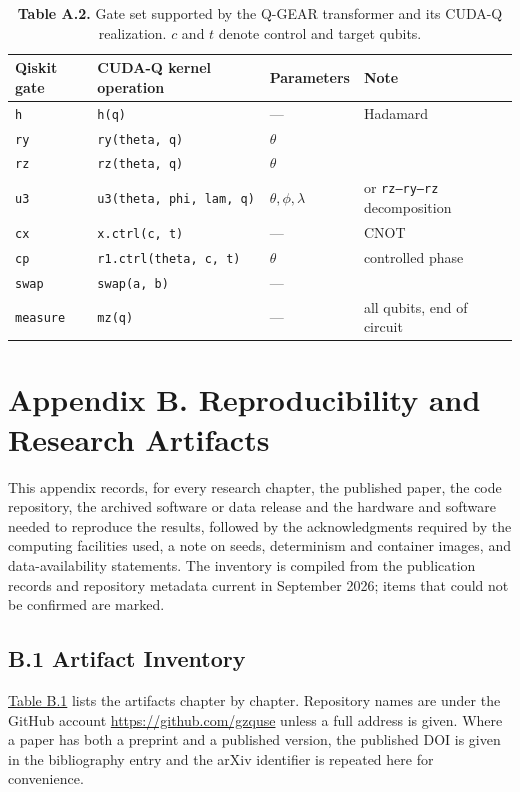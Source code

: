 \documentclass{report}
\theoremstyle{plain}
\theoremstyle{definition}
\theoremstyle{remark}
\begin{document}
\begin{table}[htbp]
\caption{\textbf{Table A.2.} Gate set supported by the Q-GEAR transformer and its CUDA-Q realization. $c$ and $t$ denote control and target qubits.}
\label{tab:appqgear:gates}
 
  \footnotesize
\begin{tabular}{llll}
\toprule
Qiskit gate & CUDA-Q kernel operation & Parameters & Note \\
\midrule
\texttt{h} & \texttt{h(q)} & --- & Hadamard \\
\texttt{ry} & \texttt{ry(theta, q)} & $\theta$ & \\
\texttt{rz} & \texttt{rz(theta, q)} & $\theta$ & \\
\texttt{u3} & \texttt{u3(theta, phi, lam, q)} & $\theta,\phi,\lambda$ & or \texttt{rz--ry--rz} decomposition \\
\texttt{cx} & \texttt{x.ctrl(c, t)} & --- & CNOT \\
\texttt{cp} & \texttt{r1.ctrl(theta, c, t)} & $\theta$ & controlled phase \\
\texttt{swap} & \texttt{swap(a, b)} & --- & \\
\texttt{measure} & \texttt{mz(q)} & --- & all qubits, end of circuit \\
\bottomrule
\end{tabular}
 
\end{table}


\chapter{Appendix B. Reproducibility and Research Artifacts}\label{app:repro}


This appendix records, for every research chapter, the published paper, the code repository, the archived software or data release and the hardware and software needed to reproduce the results, followed by the acknowledgments required by the computing facilities used, a note on seeds, determinism and container images, and data-availability statements. The inventory is compiled from the publication records and repository metadata current in September 2026; items that could not be confirmed are marked.

\section{B.1 Artifact Inventory}\label{sec:apprepro:inventory}

\hyperref[tab:apprepro:artifacts]{Table B.1} lists the artifacts chapter by chapter. Repository names are under the GitHub account \url{https://github.com/gzquse} unless a full address is given. Where a paper has both a preprint and a published version, the published DOI is given in the bibliography entry and the arXiv identifier is repeated here for convenience.
\end{document}
